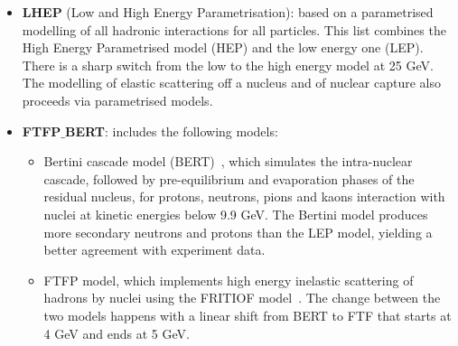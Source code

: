 \begin{itemize}
\item {\bf LHEP} (Low and High Energy Parametrisation): based on a parametrised modelling of all hadronic 
interactions for all particles. This list combines the High Energy Parametrised model (HEP) and the low energy 
one (LEP). There is a sharp switch from the low to the high energy model at 25 GeV. The modelling of elastic 
scattering off a nucleus and of nuclear capture also proceeds via parametrised models.
%
\item { \bf FTFP$\_$BERT}: includes the following models:
%
\begin{itemize}
%
\item Bertini cascade model (BERT)~\cite{Bertini:1963zzc}, which simulates the intra-nuclear cascade, followed by pre-equilibrium 
and evaporation phases of the residual nucleus, for protons, neutrons, pions and kaons interaction with 
nuclei at kinetic energies below 9.9 GeV. The Bertini model produces more secondary neutrons and protons
than the LEP model, yielding a better agreement with experiment data.
\item FTFP model, which implements high energy inelastic scattering of hadrons by nuclei using
the FRITIOF model~\cite{Andersson:1992iq}.
%
The change between the two models happens with a linear shift from BERT to FTF that starts at 4 GeV and ends at 5 GeV.
%
\end{itemize}
%
\end{itemize}

